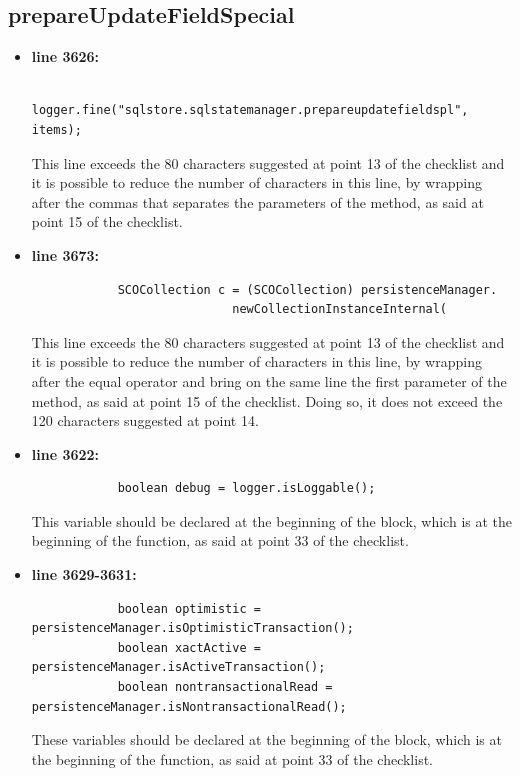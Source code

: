 \documentclass[18pt,oneside,a4paper, titlepage]{article}
\begin{document}
		\subsection{prepareUpdateFieldSpecial}
		\begin{itemize}
			\item \textbf{line 3626:} \begin{lstlisting}
			logger.fine("sqlstore.sqlstatemanager.prepareupdatefieldspl", items);
			\end{lstlisting}
			\vspace{0.1cm}
			
			This line exceeds the 80 characters suggested at point 13 of the checklist and it is possible to reduce the number of characters in this line, by wrapping after the commas that separates the parameters of the method, as said at point 15 of the checklist.
			\item \textbf{line 3673:} \begin{lstlisting}
			SCOCollection c = (SCOCollection) persistenceManager.
							newCollectionInstanceInternal(
			\end{lstlisting}
			\vspace{0.1cm}
			This line exceeds the 80 characters suggested at point 13 of the checklist and it is possible to reduce the number of characters in this line, by wrapping after the equal operator and bring on the same line the first parameter of the method, as said at point 15 of the checklist. Doing so, it does not exceed the 120 characters suggested at point 14.
			\item \textbf{line 3622:} \begin{lstlisting}
			boolean debug = logger.isLoggable();
			\end{lstlisting}
			\vspace{0.1cm}
			This variable should be declared at the beginning of the block, which is at the beginning of the function, as said at point 33 of the checklist.
			\item \textbf{line 3629-3631:} \begin{lstlisting}
			boolean optimistic = persistenceManager.isOptimisticTransaction();
			boolean xactActive = persistenceManager.isActiveTransaction();
			boolean nontransactionalRead = persistenceManager.isNontransactionalRead();
			\end{lstlisting}
			\vspace{0.1cm}
			These variables should be declared at the beginning of the block, which is at the beginning of the function, as said at point 33 of the checklist.

\end{itemize}
\end{document}
